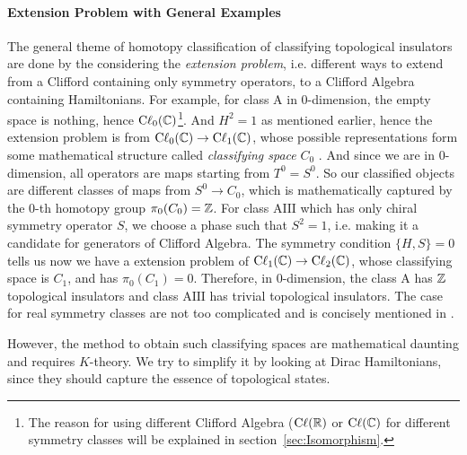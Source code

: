 \documentclass{article}
\begin{document}
\paragraph{Extension Problem with General Examples}
The general theme of homotopy classification of classifying topological
insulators are done by the considering the \textit{extension problem}, i.e.
different ways to extend from a Clifford containing only symmetry operators, to
a Clifford Algebra containing Hamiltonians. For example, for class $\mathrm{A}$
in $0$-dimension, the empty space is nothing, hence
$\mathrm{C\ell}_{0}(\mathbb{C})$\footnote{The reason for using different Clifford
Algebra ($\mathrm{C\ell}(\mathbb{R})$ or $\mathrm{C\ell}(\mathbb{C})$ for different symmetry
classes will be explained in section~\ref{sec:Isomorphism}.}. And $H^2=1$ as
mentioned earlier, hence the extension problem is from
$\mathrm{C\ell}_{0}(\mathbb{C})\to \mathrm{C\ell}_{1}(\mathbb{C})$, whose possible
representations form some mathematical structure called \textit{classifying
space} $C_0$ \cite{Morimoto2013}. And since we are in $0$-dimension, all
operators are maps starting from $T^0=S^0$. So our classified objects are
different classes of maps from $S^0\to C_0$, which is mathematically captured by
the $0$-th homotopy group $\pi_0(C_0)=\mathbb{Z}$. For class $\mathrm{AIII}$ which has
only chiral symmetry operator $S$, we choose a phase such that $S^2=1$, i.e.
making it a candidate for generators of Clifford Algebra. The symmetry condition
$\{H,S\}=0$ tells us now we have a extension problem of
$\mathrm{C\ell}_{1}(\mathbb{C})\to \mathrm{C\ell}_{2}(\mathbb{C})$, whose classifying space is
$C_1$, and has $\pi_0(C_1)=0$. Therefore, in $0$-dimension, the class
$\mathrm{A}$ has $\mathbb{Z}$ topological insulators and class $\mathrm{AIII}$ has
trivial topological insulators. The case for real symmetry classes are not too
complicated and is concisely mentioned in \cite{Morimoto2013}.

However, the method to obtain such classifying spaces are mathematical daunting
and requires $K$-theory. We try to simplify it by looking at Dirac Hamiltonians,
since they should capture the essence of topological states.
\end{document}
